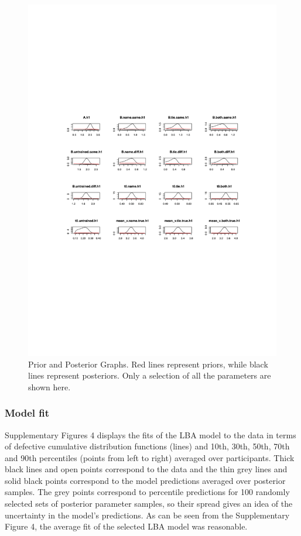 \documentclass[
  man,floatsintext]{apa6}
\begin{document}
\begin{figure}[H]

{\centering \includegraphics[height=0.67\textheight,]{../../figures/ea/pp} 

}

\caption{Prior and Posterior Graphs. Red lines represent priors, while black lines represent posteriors. Only a selection of all the parameters are shown here.}\label{fig:prior-post-plot}
\end{figure}

\subsubsection{Model fit}\label{model-fit}

Supplementary Figures 4 displays the fits of the LBA model to the data in terms of defective cumulative distribution functions (lines) and 10th, 30th, 50th, 70th and 90th percentiles (points from left to right) averaged over participants. Thick black lines and open points correspond to the data and the thin grey lines and solid black points correspond to the model predictions averaged over posterior samples. The grey points correspond to percentile predictions for 100 randomly selected sets of posterior parameter samples, so their spread gives an idea of the uncertainty in the model's predictions. As can be seen from the Supplementary Figure 4, the average fit of the selected LBA model was reasonable.
\end{document}

